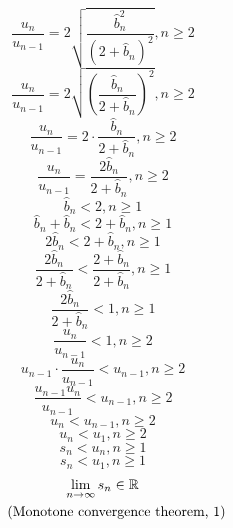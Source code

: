 \documentclass[a4paper,12pt]{report}
\newcommand{\equationnote}[1]{%
    \refstepcounter{equation}%
    \tag{#1, \theequation}%
}
\begin{document}
\begin{equation}
\frac{u_n}{u_{n-1}} = 2 \sqrt{\frac{\hat{b}_n^2}{(2 + \hat{b}_n)^2}}, n \geq 2
\end{equation}
\begin{equation}
\frac{u_n}{u_{n-1}} = 2 \sqrt{\left(\frac{\hat{b}_n}{2 + \hat{b}_n}\right)^2}, n \geq 2
\end{equation}
\begin{equation}
\frac{u_n}{u_{n-1}} = 2 \cdot \frac{\hat{b}_n}{2 + \hat{b}_n}, n \geq 2
\end{equation}
\begin{equation}
\frac{u_n}{u_{n-1}} = \frac{2 \hat{b}_n}{2 + \hat{b}_n}, n \geq 2
\end{equation}
\begin{equation}
\hat{b}_n < 2, n \geq 1
\end{equation}
\begin{equation}
\hat{b}_n + \hat{b}_n < 2 + \hat{b}_n, n \geq 1
\end{equation}
\begin{equation}
2 \hat{b}_n < 2 + \hat{b}_n, n \geq 1
\end{equation}
\begin{equation}
\frac{2 \hat{b}_n}{2 + \hat{b}_n} < \frac{2 + \hat{b}_n}{2 + \hat{b}_n}, n \geq 1
\end{equation}
\begin{equation}
\frac{2 \hat{b}_n}{2 + \hat{b}_n} < 1, n \geq 1
\end{equation}
\begin{equation}
\frac{u_n}{u_{n-1}} < 1, n \geq 2
\end{equation}
\begin{equation}
u_{n-1} \cdot \frac{u_n}{u_{n-1}} < u_{n-1}, n \geq 2
\end{equation}
\begin{equation}
\frac{u_{n-1} u_n}{u_{n-1}} < u_{n-1}, n \geq 2
\end{equation}
\begin{equation}
u_n < u_{n-1}, n \geq 2
\end{equation}
\begin{equation}
u_n < u_1, n \geq 2
\end{equation}
\begin{equation}
s_n < u_n, n \geq 1
\end{equation}
\begin{equation}
s_n < u_1, n \geq 1
\end{equation}
\begin{gather}
\lim_{n \to \infty} s_n \in \mathbb{R} \notag \\
\equationnote{Monotone convergence theorem}
\end{gather}
\end{document}
